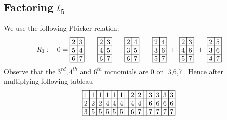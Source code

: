 \subsection{Factoring \(t_5\)}
We use the following Pl\"{u}cker relation:
\begin{align*}
R_3:\ \ \ 0 = 
\begin{array}[c]{*{2}c}\cline{1-2}
\lr{2}&\lr{3}\\\cline{1-2}
\lr{5}&\lr{4}\\\cline{1-2}
\lr{6}&\lr{7}\\\cline{1-2}
\end{array}
\ -\ 
\begin{array}[c]{*{2}c}\cline{1-2}
\lr{2}&\lr{3}\\\cline{1-2}
\lr{4}&\lr{5}\\\cline{1-2}
\lr{6}&\lr{7}\\\cline{1-2}
\end{array}
\ +\ 
\begin{array}[c]{*{2}c}\cline{1-2}
\lr{2}&\lr{4}\\\cline{1-2}
\lr{3}&\lr{5}\\\cline{1-2}
\lr{6}&\lr{7}\\\cline{1-2}
\end{array}
\ -\ 
\begin{array}[c]{*{2}c}\cline{1-2}
\lr{2}&\lr{4}\\\cline{1-2}
\lr{3}&\lr{6}\\\cline{1-2}
\lr{5}&\lr{7}\\\cline{1-2}
\end{array}
\ +\ 
\begin{array}[c]{*{2}c}\cline{1-2}
\lr{2}&\lr{3}\\\cline{1-2}
\lr{4}&\lr{6}\\\cline{1-2}
\lr{5}&\lr{7}\\\cline{1-2}
\end{array}
\ +\ 
\begin{array}[c]{*{2}c}\cline{1-2}
\lr{2}&\lr{5}\\\cline{1-2}
\lr{3}&\lr{6}\\\cline{1-2}
\lr{4}&\lr{7}\\\cline{1-2}
\end{array}
\end{align*}
Observe that the \(3^{rd},4^{th}\) and \(6^{th}\) monomials are \(0\) on [3,6,7].
Hence after multiplying following tableau  
\begin{align*}
\begin{array}[c]{*{14}c}\cline{1-14}
\lr{1}&\lr{1}&\lr{1}&\lr{1}&\lr{1}&\lr{1}&\lr{}&\lr{2}&\lr{2}&\lr{}&\lr{3}&\lr{3}&\lr{3}&\lr{3}\\\cline{1-14}
\lr{2}&\lr{2}&\lr{2}&\lr{4}&\lr{4}&\lr{4}&\lr{}&\lr{4}&\lr{4}&\lr{}&\lr{6}&\lr{6}&\lr{6}&\lr{6}\\\cline{1-14}
\lr{3}&\lr{5}&\lr{5}&\lr{5}&\lr{5}&\lr{5}&\lr{}&\lr{6}&\lr{7}&\lr{}&\lr{7}&\lr{7}&\lr{7}&\lr{7}\\\cline{1-14}
\end{array}
\end{align*}
